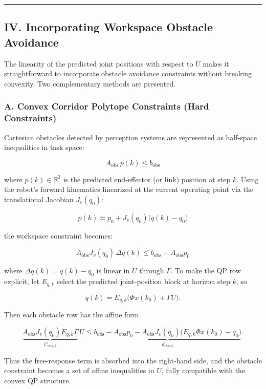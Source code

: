 \begin{center}\rule{0.5\linewidth}{0.5pt}\end{center}

\subsection{IV. Incorporating Workspace Obstacle
Avoidance}\label{iv.-incorporating-workspace-obstacle-avoidance}

The linearity of the predicted joint positions with respect to \(U\)
makes it straightforward to incorporate obstacle avoidance constraints
without breaking convexity. Two complementary methods are presented.

\subsubsection{A. Convex Corridor Polytope Constraints (Hard
Constraints)}\label{a.-convex-corridor-polytope-constraints-hard-constraints}

Cartesian obstacles detected by perception systems are represented as
half-space inequalities in task space:

\[A_{\text{obs}} \, p(k) \leq b_{\text{obs}}\]

where \(p(k) \in \mathbb{R}^3\) is the predicted end-effector (or link)
position at step \(k\). Using the robot's forward kinematics linearized
at the current operating point via the translational Jacobian
\(J_v(q_0)\):

\[p(k) \approx p_0 + J_v(q_0)\bigl(q(k) - q_0\bigr)\]

the workspace constraint becomes:

\[A_{\text{obs}} J_v(q_0) \, \Delta q(k) \leq b_{\text{obs}} - A_{\text{obs}} p_0\]

where \(\Delta q(k) = q(k) - q_0\) is linear in \(U\) through
\(\Gamma\). To make the QP row explicit, let \(E_{q,k}\) select the
predicted joint-position block at horizon step \(k\), so

\[q(k)=E_{q,k}\bigl(\Phi x(k_0)+\Gamma U\bigr).\]

Then each obstacle row has the affine form

\[
\underbrace{A_{\text{obs}}J_v(q_0)E_{q,k}\Gamma}_{C_{\text{obs},k}}\,U
\le
\underbrace{b_{\text{obs}}-A_{\text{obs}}p_0
-A_{\text{obs}}J_v(q_0)\bigl(E_{q,k}\Phi x(k_0)-q_0\bigr)}_{d_{\text{obs},k}} .
\]

Thus the free-response term is absorbed into the right-hand side, and
the obstacle constraint becomes a set of affine inequalities in \(U\),
fully compatible with the convex QP structure.

